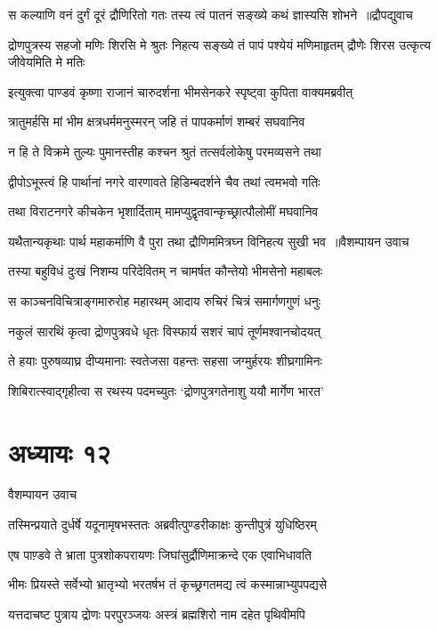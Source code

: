 \threelineshloka
{स कल्याणि वनं दुर्गं दूरं द्रौणिरितो गतः}
{तस्य त्वं पातनं सङ्ख्ये कथं ज्ञास्यसि शोभने ॥द्रौपद्युवाच}
{}


\threelineshloka
{द्रोणपुत्रस्य सहजो मणिः शिरसि मे श्रुतः}
{निहत्य सङ्ख्ये तं पापं पश्येयं मणिमाहृतम्}
{द्रौणेः शिरस उत्कृत्य जीवेयमिति मे मतिः}


\twolineshloka
{इत्युक्त्वा पाण्डवं कृष्णा राजानं चारुदर्शना}
{भीमसेनकरे स्पृष्ट्वा कुपिता वाक्यमब्रवीत्}


\twolineshloka
{त्रातुमर्हसि मां भीम क्षत्रधर्ममनुस्मरन्}
{जहि तं पापकर्माणं शम्बरं सघवानिव}


\twolineshloka
{न हि ते विक्रमे तुल्यः पुमानस्तीह कश्चन}
{श्रुतं तत्सर्वलोकेषु परमव्यसने तथा}


\twolineshloka
{द्वीपोऽभूस्त्वं हि पार्थानां नगरे वारणावते}
{हिडिम्बदर्शने चैव तथां त्वमभवो गतिः}


\twolineshloka
{तथा विराटनगरे कीचकेन भृशार्दिताम्}
{मामप्युद्वृतवान्कृच्छ्रात्पौलोमीं मघवानिव}


\threelineshloka
{यथैतान्यकृथाः पार्थ महाकर्माणि वै पुरा}
{तथा द्रौणिममित्रघ्न विनिहत्य सुखी भव ॥वैशम्पायन उवाच}
{}


\twolineshloka
{तस्या बहुविधं दुःखं निशम्य परिदेवितम्}
{न चामर्षत कौन्तेयो भीमसेनो महाबलः}


\twolineshloka
{स काञ्चनविचित्राङ्गमारुरोह महारथम्}
{आदाय रुचिरं चित्रं समार्गणगुणं धनुः}


\twolineshloka
{नकुलं सारथिं कृत्वा द्रोणपुत्रवधे धृतः}
{विस्फार्य सशरं चापं तूर्णमश्वानचोदयत्}


\twolineshloka
{ते हयाः पुरुषव्याघ्र दीप्यमानाः स्वतेजसा}
{वहन्तः सहसा जग्मुर्हरयः शीघ्रगामिनः}


\twolineshloka
{शिबिरात्स्वाद्गृहीत्वा स रथस्य पदमच्युतः}
{`द्रोणपुत्रगतेनाशु ययौ मार्गेण भारत'}


\chapter{अध्यायः १२}
\twolineshloka
{वैशम्पायन उवाच}
{}


\twolineshloka
{तस्मिन्प्रयाते दुर्धर्षे यदूनामृषभस्ततः}
{अब्रवीत्पुण्डरीकाक्षः कुन्तीपुत्रं युधिष्ठिरम्}


\twolineshloka
{एष पाण़्डवे ते भ्राता पुत्रशोकपरायणः}
{जिघांसुर्द्रौणिमाक्रन्दे एक एवाभिधावति}


\twolineshloka
{भीमः प्रियस्ते सर्वेभ्यो भ्रातृभ्यो भरतर्षभ}
{तं कृच्छ्रगतमद्य त्वं कस्मान्नाभ्युपपद्यसे}


\twolineshloka
{यत्तदाचष्ट पुत्राय द्रोणः परपुरञ्जयः}
{अस्त्रं ब्रह्मशिरो नाम दहेत पृथिवीमपि}



